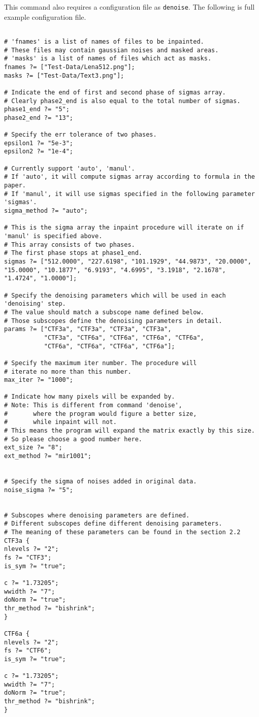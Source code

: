\documentclass[a4paper,5pt]{article}
\begin{document}
  This command also requires a configuration file as \lstinline{denoise}. The following is full example configuration file.
  
\begin{lstlisting}

# 'fnames' is a list of names of files to be inpainted. 
# These files may contain gaussian noises and masked areas.
# 'masks' is a list of names of files which act as masks.
fnames ?= ["Test-Data/Lena512.png"];
masks ?= ["Test-Data/Text3.png"];

# Indicate the end of first and second phase of sigmas array.
# Clearly phase2_end is also equal to the total number of sigmas.
phase1_end ?= "5";
phase2_end ?= "13";

# Specify the err tolerance of two phases.
epsilon1 ?= "5e-3";
epsilon2 ?= "1e-4";

# Currently support 'auto', 'manul'.
# If 'auto', it will compute sigmas array according to formula in the paper.
# If 'manul', it will use sigmas specified in the following parameter 'sigmas'.
sigma_method ?= "auto";

# This is the sigma array the inpaint procedure will iterate on if 'manul' is specified above.
# This array consists of two phases.
# The first phase stops at phase1_end.
sigmas ?= ["512.0000", "227.6198", "101.1929", "44.9873", "20.0000",  "15.0000", "10.1877", "6.9193", "4.6995", "3.1918", "2.1678", "1.4724", "1.0000"];

# Specify the denoising parameters which will be used in each 'denoising' step.
# The value should match a subscope name defined below. 
# Those subscopes define the denoising parameters in detail.
params ?= ["CTF3a", "CTF3a", "CTF3a", "CTF3a", 
           "CTF3a", "CTF6a", "CTF6a", "CTF6a", "CTF6a", 
           "CTF6a", "CTF6a", "CTF6a", "CTF6a"];

# Specify the maximum iter number. The procedure will
# iterate no more than this number.
max_iter ?= "1000";

# Indicate how many pixels will be expanded by.
# Note: This is different from command 'denoise', 
#       where the program would figure a better size,
#       while inpaint will not.
# This means the program will expand the matrix exactly by this size. 
# So please choose a good number here.
ext_size ?= "8";
ext_method ?= "mir1001";


# Specify the sigma of noises added in original data.
noise_sigma ?= "5";


# Subscopes where denoising parameters are defined.
# Different subscopes define different denoising parameters.
# The meaning of these parameters can be found in the section 2.2
CTF3a {
nlevels ?= "2";
fs ?= "CTF3";
is_sym ?= "true";

c ?= "1.73205";
wwidth ?= "7";
doNorm ?= "true";
thr_method ?= "bishrink";
}

CTF6a {
nlevels ?= "2";
fs ?= "CTF6";
is_sym ?= "true";

c ?= "1.73205";
wwidth ?= "7";
doNorm ?= "true";
thr_method ?= "bishrink";
}

\end{lstlisting}
\end{document}

